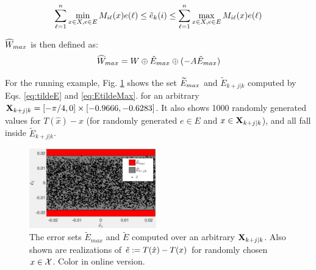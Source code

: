 \begin{equation}
\label{eq:EtildeMax}
\sum_{\ell=1}^{n} \min_{x \in X, e \in E} M_{i\ell}(x)e(\ell)  \leq \tilde{e}_{k}(i)  \leq \sum_{\ell=1}^{n} \max_{x \in X, e \in E} M_{i\ell}(x)e(\ell)
\end{equation}

$\widehat{W}_{max}$ is then defined as:
\begin{equation}
\widehat{W}_{max} = W \oplus \tilde{E}_{max} \oplus (-A\tilde{E}_{max})
\end{equation}

For the running example, Fig. \ref{fig:err_bound_toy} shows the set $\widetilde{E}_{max}$ and $\tilde{E}_{k+j|k}$ computed by Eqs. \eqref{eq:tildeE} and \eqref{eq:EtildeMax}. for an arbitrary  $\mathbf{X}_{k+j|k} =  [-\pi/4,0]\times[-0.9666,-0.6283]$. It also shows 1000 randomly generated values for $T(\hat{x})-x$ (for randomly generated $e \in E$ and $x \in \mathbf{X}_{k+j|k}$), and all fall inside $\tilde{E}_{k+j|k}$.


\begin{figure}
	\includegraphics[angle=0,width=0.49\textwidth]{figs/Err_Bounds_toy.pdf}
	\caption{The error sets $\tilde{E}_{max}$ and $\tilde{E}$ computed over an arbitrary $\mathbf{X}_{k+j|k}$. Also shown are realizations of $\tilde{e} := T(\hat{x}) - T(x)$ for randomly chosen $x \in \mathcal{X}$. Color in online version.}
	\label{fig:err_bound_toy}
\end{figure}


